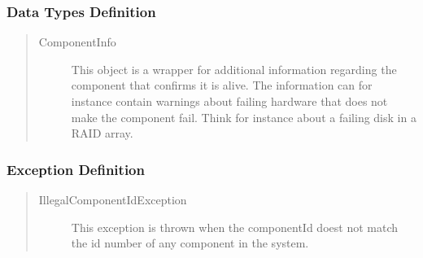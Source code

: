 \subsubsection{Data Types Definition}

\begin{quote}
	\begin{description}
		\item[ComponentInfo] This object is a wrapper for additional information
		regarding the component that confirms it is alive. The information can for
		instance contain warnings about failing hardware that does not make the
		component fail. Think for instance about a failing disk in a RAID array.
	\end{description} 
\end{quote}

\subsubsection{Exception Definition} 

\begin{quote}
	\begin{description}
		\item[IllegalComponentIdException] This exception is thrown when the
		componentId doest not match the id number of any component in the system.
	\end{description} 
\end{quote}
